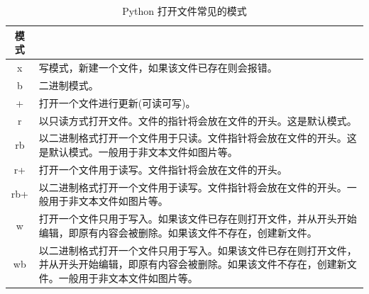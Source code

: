 \documentclass[cn,10pt,math=newtx,citestyle=gb7714-2015,bibstyle=gb7714-2015]{elegantbook}
\begin{document}
\begin{table}[ht]
\centering
\caption{Python 打开文件常见的模式}
\begin{tabular}{|c|m{15cm}|}
\hline
\rowcolor[HTML]{555555} 
{\color[HTML]{FFFFFF} \textbf{模式}} & \multicolumn{1}{c|}{\cellcolor[HTML]{555555}{\color[HTML]{FFFFFF} \textbf{描述}}}                         \\ \hline
\rowcolor[HTML]{F6F4F0} 
{\color[HTML]{333333} x}           & {\color[HTML]{333333} 写模式，新建一个文件，如果该文件已存在则会报错。}                                                         \\ \hline
\rowcolor[HTML]{FFFFFF} 
{\color[HTML]{333333} b}           & {\color[HTML]{333333} 二进制模式。}                                                                           \\ \hline
\rowcolor[HTML]{F6F4F0} 
{\color[HTML]{333333} +}           & {\color[HTML]{333333} 打开一个文件进行更新(可读可写)。}                                                                \\ \hline
\rowcolor[HTML]{F6F4F0} 
{\color[HTML]{333333} r}           & {\color[HTML]{333333} 以只读方式打开文件。文件的指针将会放在文件的开头。这是默认模式。}                                                 \\ \hline
\rowcolor[HTML]{FFFFFF} 
{\color[HTML]{333333} rb}          & {\color[HTML]{333333} 以二进制格式打开一个文件用于只读。文件指针将会放在文件的开头。这是默认模式。一般用于非文本文件如图片等。}                             \\ \hline
\rowcolor[HTML]{F6F4F0} 
{\color[HTML]{333333} r+}          & {\color[HTML]{333333} 打开一个文件用于读写。文件指针将会放在文件的开头。}                                                        \\ \hline
\rowcolor[HTML]{FFFFFF} 
{\color[HTML]{333333} rb+}         & {\color[HTML]{333333} 以二进制格式打开一个文件用于读写。文件指针将会放在文件的开头。一般用于非文本文件如图片等。}                                    \\ \hline
\rowcolor[HTML]{F6F4F0} 
{\color[HTML]{333333} w}           & {\color[HTML]{333333} 打开一个文件只用于写入。如果该文件已存在则打开文件，并从开头开始编辑，即原有内容会被删除。如果该文件不存在，创建新文件。}                     \\ \hline
\rowcolor[HTML]{FFFFFF} 
{\color[HTML]{333333} wb}          & {\color[HTML]{333333} 以二进制格式打开一个文件只用于写入。如果该文件已存在则打开文件，并从开头开始编辑，即原有内容会被删除。如果该文件不存在，创建新文件。一般用于非文本文件如图片等。} \\ \hline

\end{tabular}
\end{table}
\end{document}
